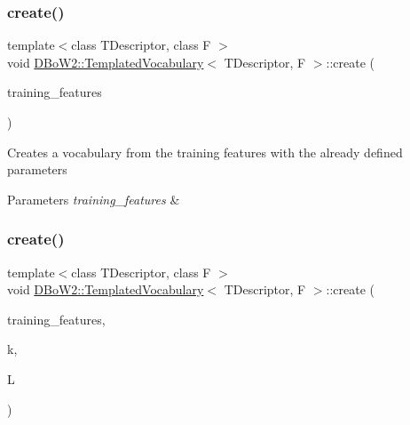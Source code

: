 \subsubsection{\texorpdfstring{create()}{create()}\hspace{0.1cm}{\footnotesize\ttfamily [1/3]}}
{\footnotesize\ttfamily template$<$class T\+Descriptor, class F $>$ \\
void \hyperlink{classDBoW2_1_1TemplatedVocabulary}{D\+Bo\+W2\+::\+Templated\+Vocabulary}$<$ T\+Descriptor, F $>$\+::create (\begin{DoxyParamCaption}\item[{const std\+::vector$<$ std\+::vector$<$ T\+Descriptor $>$ $>$ \&}]{training\+\_\+features }\end{DoxyParamCaption})\hspace{0.3cm}{\ttfamily [virtual]}}

Creates a vocabulary from the training features with the already defined parameters 
\begin{DoxyParams}{Parameters}
{\em training\+\_\+features} & \\
\hline
\end{DoxyParams}
\mbox{\label{classDBoW2_1_1TemplatedVocabulary_a94d48231b043a1102af4c35e256f2054}} 
\subsubsection{\texorpdfstring{create()}{create()}\hspace{0.1cm}{\footnotesize\ttfamily [2/3]}}
{\footnotesize\ttfamily template$<$class T\+Descriptor, class F $>$ \\
void \hyperlink{classDBoW2_1_1TemplatedVocabulary}{D\+Bo\+W2\+::\+Templated\+Vocabulary}$<$ T\+Descriptor, F $>$\+::create (\begin{DoxyParamCaption}\item[{const std\+::vector$<$ std\+::vector$<$ T\+Descriptor $>$ $>$ \&}]{training\+\_\+features,  }\item[{int}]{k,  }\item[{int}]{L }\end{DoxyParamCaption})\hspace{0.3cm}{\ttfamily [virtual]}}


